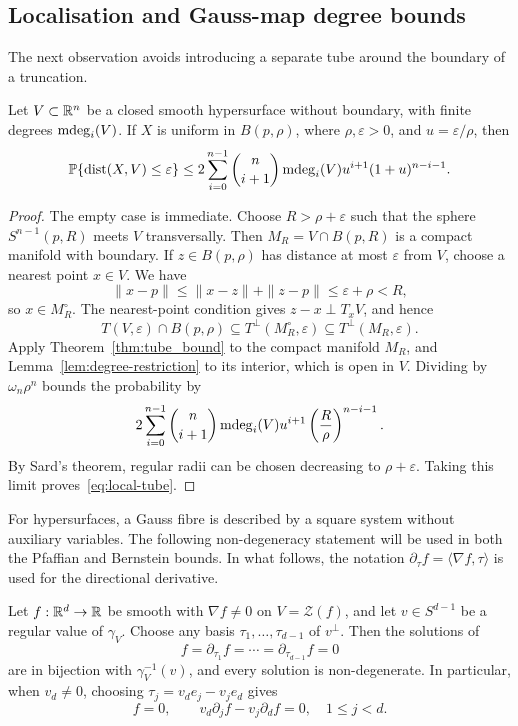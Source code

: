 \subsection{Localisation and Gauss-map degree bounds}
The next observation avoids introducing a separate tube around the boundary of a truncation.

\begin{proposition}\label{prop:local-tube}
Let $V\subset\mathbb{R}^n$ be a closed smooth hypersurface without boundary, with finite degrees $\operatorname{\mathrm{mdeg}}_i(V)$. If $X$ is uniform in $B(p,\rho)$, where $\rho,\varepsilon>0$, and $u=\varepsilon/\rho$, then
\begin{equation}\label{eq:local-tube}
\operatorname*{\mathbb{P}}\{\operatorname{dist}(X,V)\le\varepsilon\}\le
2\sum_{i=0}^{n-1}\binom n{i+1}\operatorname{\mathrm{mdeg}}_i(V) u^{i+1}(1+u)^{n-i-1}.
\end{equation}
\end{proposition}

\begin{proof}
The empty case is immediate. Choose $R>\rho+\varepsilon$ such that the sphere $S^{n-1}(p,R)$ meets $V$ transversally. Then $M_R=V\cap B(p,R)$ is a compact manifold with boundary. If $z\in B(p,\rho)$ has distance at most $\varepsilon$ from $V$, choose a nearest point $x\in V$. We have
\[
\|x-p\|\le\|x-z\|+\|z-p\|\le\varepsilon+\rho<R,
\]
so $x\in M_R^\circ$. The nearest-point condition gives $z-x\perp T_xV$, and hence
\[
T(V,\varepsilon)\cap B(p,\rho)
\subseteq T^\perp(M_R^\circ,\varepsilon)
\subseteq T^\perp(M_R,\varepsilon).
\]
Apply Theorem~\ref{thm:tube_bound} to the compact manifold $M_R$, and Lemma~\ref{lem:degree-restriction} to its interior, which is open in $V$. Dividing by $\omega_n\rho^n$ bounds the probability by
\[
2\sum_{i=0}^{n-1}\binom n{i+1}\operatorname{\mathrm{mdeg}}_i(V)
u^{i+1}\left(\frac R\rho\right)^{n-i-1}.
\]
By Sard's theorem, regular radii can be chosen decreasing to $\rho+\varepsilon$. Taking this limit proves~\eqref{eq:local-tube}.
\end{proof}

For hypersurfaces, a Gauss fibre is described by a square system without auxiliary variables. The following non-degeneracy statement will be used in both the Pfaffian and Bernstein bounds. In what follows, the notation $\partial_{\tau}f=\langle\nabla f,\tau\rangle$ is used for the directional derivative.

\begin{lemma}\label{le:gauss-nondegenerate}
Let $f:\mathbb{R}^d\to\mathbb{R}$ be smooth with $\nabla f\ne0$ on $V=\mathcal Z(f)$, and let $v\in S^{d-1}$ be a regular value of $\gamma_V$. Choose any basis $\tau_1,\dots,\tau_{d-1}$ of $v^\perp$. Then the solutions of
\begin{equation}\label{eq:gauss-directional-system}
f=\partial_{\tau_1}f=\cdots=\partial_{\tau_{d-1}}f=0
\end{equation}
are in bijection with $\gamma_V^{-1}(v)$, and every solution is non-degenerate. In particular, when $v_d\ne0$, choosing $\tau_j=v_de_j-v_je_d$ gives
\begin{equation}\label{eq:gauss-cross-system}
f=0,\qquad v_d\partial_j f-v_j\partial_d f=0,\quad 1\le j<d.
\end{equation}
\end{lemma}

